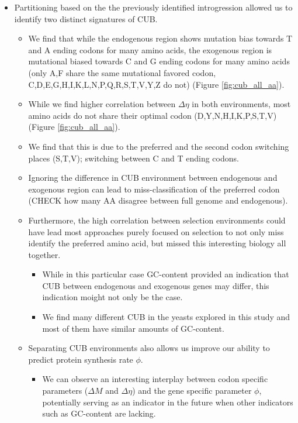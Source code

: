 \documentclass[12pt]{article}
\begin{document}
\begin{itemize}
	\item Partitioning \kluyveri based on the the previously identified introgression allowed us to identify two distinct signatures of CUB.
	\begin{itemize}
		\item We find that while the endogenous region shows mutation bias towards T and A ending codons for many amino acids, the exogenous region is mutational biased towards C and G ending codons for many amino acids (only A,F share the same mutational favored codon, C,D,E,G,H,I,K,L,N,P,Q,R,S,T,V,Y,Z do not) (Figure \ref{fig:cub_all_aa}).
		\item While we find higher correlation between $\Delta \eta$ in both environments, most amino acids do not share their optimal codon (D,Y,N,H,I,K,P,S,T,V) (Figure \ref{fig:cub_all_aa}).
		\item We find that this is due to the preferred and the second codon switching places (S,T,V);  switching between C and T ending codons.
		\item Ignoring the difference in CUB environment between endogenous and exogenous region can lead to miss-classification of the preferred codon (CHECK how many AA disagree between full genome and endogenous).
		\item Furthermore, the high correlation between selection environments could have lead most approaches purely focused on selection to not only miss identify the preferred amino acid, but missed this interesting biology all together.
		\begin{itemize}
			\item While in this particular case GC-content provided an indication that CUB between endogenous and exogenous genes may differ, this indication moight not only be the case.
			\item We find many different CUB in the yeasts explored in this study and most of them have similar amounts of GC-content.
		\end{itemize}
		\item Separating CUB environments also allows us improve our ability to predict protein synthesis rate $\phi$.
		\begin{itemize}
			\item We can observe an interesting interplay between codon specific parameters ($\Delta M$ and $\Delta \eta$) and the gene specific parameter $\phi$, potentially serving as an indicator in the future when other indicators such as GC-content are lacking.

\end{itemize}
\end{itemize}
\end{itemize}
\end{document}
